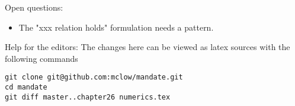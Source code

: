 
Open questions:
\begin{itemize}
\item{The "xxx relation holds" formulation needs a pattern.}
\end{itemize}



\vfill
Help for the editors: The changes here can be viewed as latex sources with the following commands
\begin{verbatim}
git clone git@github.com:mclow/mandate.git
cd mandate
git diff master..chapter26 numerics.tex
\end{verbatim}

